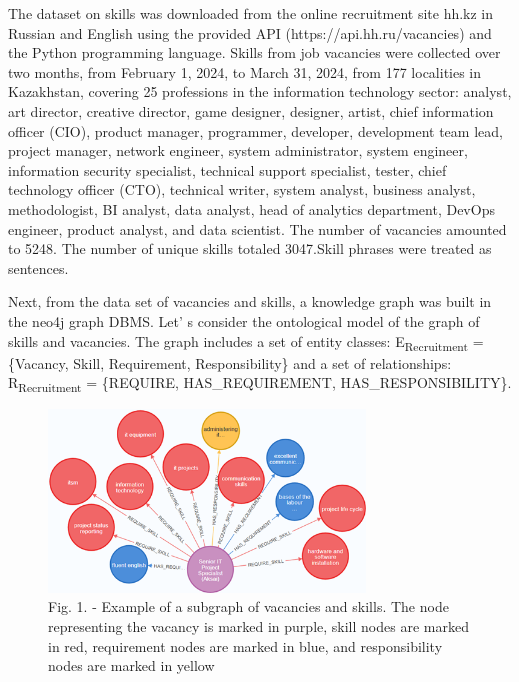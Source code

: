 \begin{multicols}{2}
The dataset on skills was downloaded from the online recruitment site
hh.kz in Russian and English using the provided API
(https://api.hh.ru/vacancies) and the Python programming language.
Skills from job vacancies were collected over two months, from February
1, 2024, to March 31, 2024, from 177 localities in Kazakhstan, covering
25 professions in the information technology sector: analyst, art
director, creative director, game designer, designer, artist, chief
information officer (CIO), product manager, programmer, developer,
development team lead, project manager, network engineer, system
administrator, system engineer, information security specialist,
technical support specialist, tester, chief technology officer (CTO),
technical writer, system analyst, business analyst, methodologist, BI
analyst, data analyst, head of analytics department, DevOps engineer,
product analyst, and data scientist. The number of vacancies amounted to
5248. The number of unique skills totaled 3047.Skill phrases were
treated as sentences.

Next, from the data set of vacancies and skills, a knowledge graph was
built in the neo4j graph DBMS. Let' s consider the
ontological model of the graph of skills and vacancies. The graph
includes a set of entity classes: E\textsubscript{Recruitment} =
\{Vacancy, Skill, Requirement, Responsibility\} and a set of
relationships: R\textsubscript{Recruitment} = \{REQUIRE,
HAS\_REQUIREMENT, HAS\_RESPONSIBILITY\}.
\end{multicols}

\begin{figure}[H]
	\centering
	\includegraphics[width=0.75\textwidth]{media/ict/image104}
	\caption*{Fig. 1. - Example of a subgraph of vacancies and skills. The
node representing the vacancy is marked in purple, skill nodes are
marked in red, requirement nodes are marked in blue, and responsibility
nodes are marked in yellow}
\end{figure}

